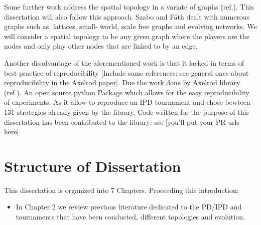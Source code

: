Some further work address the spatial topology in a variate of graphs (ref.).
This dissertation will also follow this approach. Szabo and Fáth dealt with
numerous graphs such as, lattices, small- world, scale free graphs and evolving
networks. We will consider a spatial topology to be any given graph  where the
players are the nodes and only play other nodes that are linked to by
an edge.

Another disadvantage of the aforementioned work is that it lacked in terms of
best practice of reproducibility [Include some references: see general ones
about reproducibility in the Axelrod paper]. Due the work done by Axelrod
library  (ref.). An open source python Package which allows for the easy
reproducibility of experiments.  As it allow to reproduce an IPD tournament and
chose bewteen 131 strategies already given by the library.  Code written for the
purpose of this dissertation has been contributed to the library: see [you'll
put your PR urls here].

\section{Structure of Dissertation}
This dissertation is organized into 7 Chapters. Proceeding this introduction:
\begin{itemize}
  \item In Chapter 2 we review previous literature dedicated to the PD/IPD
        and tournaments that have been conducted, different topologies and evolution.
\end{itemize}
